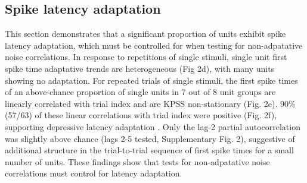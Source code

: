 \documentclass{article}
\begin{document}
\subsection*{Spike latency adaptation}


This section demonstrates that a significant proportion of units exhibit spike latency adaptation, which must be controlled for when testing for non-adpatative noise correlations. In response to repetitions of single stimuli, single unit first spike time adaptative trends are heterogeneous (Fig 2d), with many units showing no adaptation. For repeated trials of single stimuli, the first spike times of an above-chance proportion of single units in 7 out of 8 unit groups are linearly correlated with trial index and are KPSS non-stationary (Fig. 2e). $90\%$ (57/63) of these linear correlations with trial index were positive (Fig. 2f), supporting depressive latency adaptation \cite{ahissar2000transformation, ahissar2001temporal, kheradpezhouh2017response}. Only the lag-2 partial autocorrelation was slightly above chance (lags 2-5 tested, Supplementary Fig. 2), suggestive of additional structure in the trial-to-trial sequence of first spike times for a small number of units. These findings show that tests for non-adpatative noise correlations must control for latency adaptation.






\end{document}
